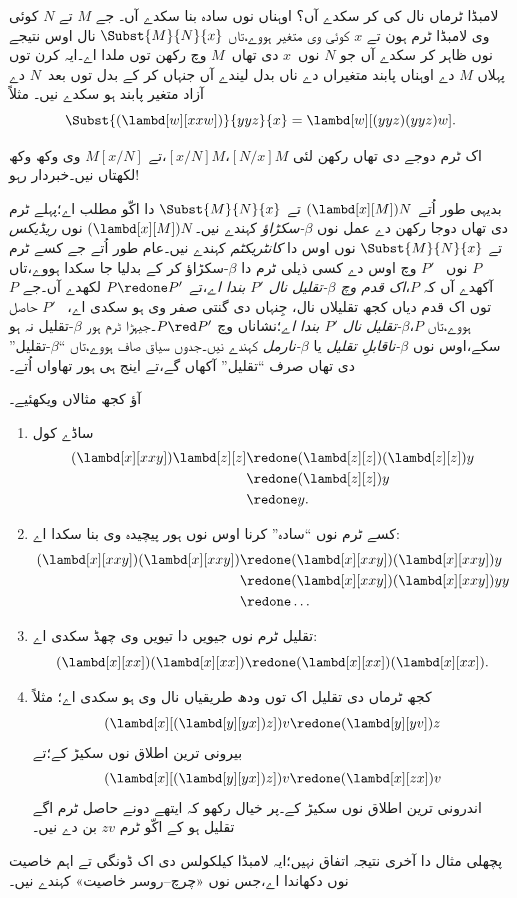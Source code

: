 \documentclass[../../../include/open-logic-section]{subfiles}
\begin{document}

لامبڈا ٹرماں نال کی کر سکدے آں؟ اوہناں نوں سادہ بنا سکدے آں۔ جے $M$ تے $N$ کوئی وی لامبڈا ٹرم ہون تے $x$ کوئی وی
متغیر ہووے،تاں $\Subst{M}{N}{x}$ نال اوس نتیجے نوں ظاہر کر
سکدے آں جو $N$ نوں~$x$ دی تھاں~$M$ وچ رکھن توں ملدا اے۔ایہ
کرن توں پہلاں $M$ دے اوہناں پابند متغیراں دے ناں بدل لیندے آں
جنہاں کر کے بدل توں بعد~$N$ دے آزاد متغیر پابند ہو سکدے نیں۔ مثلاً
\[
\Subst{(\lambd[w][xxw])}{yyz}{x} = \lambd[w][(yyz)(yyz)w].
\]

\begin{digress}
اک ٹرم دوجے دی تھاں رکھن لئی $[N/x]M$،$[x/N]M$،تے $M[x/N]$ وی
وکھ وکھ لکھتاں نیں۔خبردار رہو!
\end{digress}

بدیہی طور اُتے $(\lambd[x][M])N$ تے $\Subst{M}{N}{x}$ دا
اکّو مطلب اے؛پہلے ٹرم دی تھاں دوجا رکھن دے عمل نوں
\emph{$\beta$-سکڑاؤ} کہندے نیں۔$(\lambd[x][M])N$ نوں
\emph{ریڈیکس} تے $\Subst{M}{N}{x}$ نوں اوس دا
\emph{کانٹریکٹم} کہندے نیں۔عام طور اُتے جے کسے ٹرم $P$ نوں
~$P'$ وچ اوس دے کسی ذیلی ٹرم دا $\beta$-سکڑاؤ کر کے بدلیا جا
سکدا ہووے،تاں آکھدے آں کہ $P$،\emph{اک قدم وچ $\beta$-تقلیل
نال $P'$ بندا اے}،تے $P \redone P'$ لکھدے آں۔جے $P$ توں
اک قدم دیاں کجھ تقلیلاں نال، جِنہاں دی گنتی صفر وی ہو سکدی اے،
~$P'$ حاصل ہووے،تاں $P$،\emph{$\beta$-تقلیل نال $P'$ بندا
اے}؛نشاناں وچ $P \red P'$۔جیہڑا ٹرم ہور
$\beta$-تقلیل نہ ہو سکے،اوس نوں \emph{$\beta$-ناقابلِ تقلیل}
یا \emph{$\beta$-نارمل} کہندے نیں۔جدوں سیاق صاف ہووے،تاں
``$\beta$-تقلیل'' دی تھاں صرف ``تقلیل'' آکھاں گے،تے اینج
ہی ہور تھاواں اُتے۔

آؤ کجھ مثالاں ویکھئیے۔
\begin{enumerate}
\item ساڈے کول
\begin{align*}
(\lambd[x][xxy]) \lambd[z][z] & \redone (\lambd[z][z])(\lambd[z][z]) y \\
& \redone (\lambd[z][z]) y \\
& \redone y.
\end{align*}
\item کسے ٹرم نوں ``سادہ'' کرنا اوس نوں ہور پیچیدہ وی بنا سکدا اے:
\begin{align*}
(\lambd[x][xxy])(\lambd[x][xxy]) & \redone (\lambd[x][xxy])(\lambd[x][xxy])y \\
& \redone (\lambd[x][xxy])(\lambd[x][xxy])yy \\
& \redone \dots
\end{align*}
\item تقلیل ٹرم نوں جیویں دا تیویں وی چھڈ سکدی اے:
\[
(\lambd[x][xx])(\lambd[x][xx]) \redone (\lambd[x][xx])(\lambd[x][xx]).
\]
\item کجھ ٹرماں دی تقلیل اک توں ودھ طریقیاں نال وی ہو سکدی اے؛
  مثلاً
\[
(\lambd[x][(\lambd[y][yx]) z]) v \redone (\lambd[y][yv]) z
\]
  بیرونی ترین اطلاق نوں سکیڑ کے؛تے
\[
(\lambd[x][(\lambd[y][yx]) z]) v \redone (\lambd[x][zx]) v
\]
  اندرونی ترین اطلاق نوں سکیڑ کے۔پر خیال رکھو کہ ایتھے
  دونے حاصل ٹرم اگے تقلیل ہو کے اکّو ٹرم $zv$ بن دے نیں۔
\end{enumerate}

پچھلی مثال دا آخری نتیجہ اتفاق نہیں؛ایہ لامبڈا کیلکولس دی
اک ڈونگی تے اہم خاصیت نوں دکھاندا اے،جس نوں
«چرچ--روسر خاصیت» کہندے نیں۔
\end{document}

